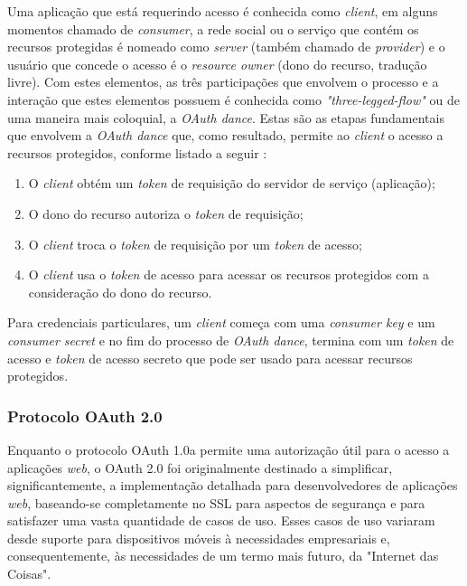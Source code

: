 Uma aplicação que está requerindo acesso é conhecida como \textit{client}, em alguns momentos chamado de \textit{consumer}, a rede social ou o serviço que contém os recursos protegidas é nomeado como \textit{server} (também chamado de \textit{provider}) e o usuário que concede o acesso é o \textit{resource owner} (dono do recurso, tradução livre). Com estes elementos, as três participações que envolvem o processo e a interação que estes elementos possuem é conhecida como \textit{"three-legged-flow"} ou de uma maneira mais coloquial, a \textit{OAuth dance}. Estas são as etapas fundamentais que envolvem a \textit{OAuth dance} que, como resultado, permite ao \textit{client} o acesso a recursos protegidos, conforme listado a seguir \cite{mining-social-web}:

\begin{enumerate}
	\item O \textit{client} obtém um \textit{token} de requisição do servidor de serviço (aplicação);
	\item O dono do recurso autoriza o \textit{token} de requisição;
	\item O \textit{client} troca o \textit{token} de requisição por um \textit{token} de acesso;
	\item O \textit{client} usa o \textit{token} de acesso para acessar os recursos protegidos com a consideração do dono do recurso.
\end{enumerate}

Para credenciais particulares, um \textit{client} começa com uma \textit{consumer key} e um \textit{consumer secret} e no fim do processo de \textit{OAuth dance}, termina com um \textit{token} de acesso e \textit{token} de acesso secreto que pode ser usado para acessar recursos protegidos.

\subsubsection{Protocolo OAuth 2.0}
Enquanto o protocolo OAuth 1.0a permite uma autorização útil para o acesso a aplicações \textit{web}, o OAuth 2.0 foi originalmente destinado a simplificar, significantemente, a implementação detalhada para desenvolvedores de aplicações \textit{web}, baseando-se completamente no SSL para aspectos de segurança e para satisfazer uma vasta quantidade de casos de uso. Esses casos de uso variaram desde suporte para dispositivos móveis à necessidades empresariais e, consequentemente, às necessidades de um termo mais futuro, da "Internet das Coisas"\space \cite{mining-social-web}.

